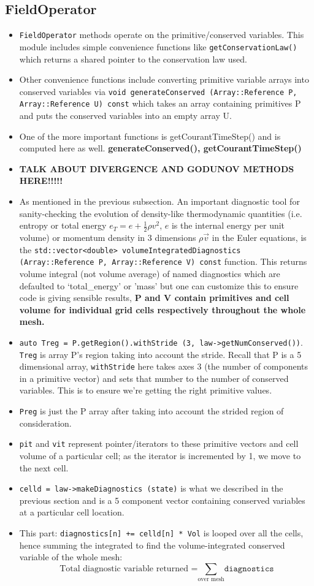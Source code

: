 \documentclass{article}
\begin{document}
\subsection{FieldOperator}
\begin{itemize}
	\item \texttt{FieldOperator} methods operate on the primitive/conserved variables. This module includes simple convenience functions like \texttt{getConservationLaw()} which returns a shared pointer to the conservation law used. 
	\item Other convenience functions include converting primitive variable arrays into conserved variables via \texttt{void generateConserved (Array::Reference P, Array::Reference U) const} which takes an array containing primitives P and puts the conserved variables into an empty array U. 
	\item One of the more important functions is getCourantTimeStep() and is computed here as well. \textbf{generateConserved(), getCourantTimeStep()}
	\item \textbf{TALK ABOUT DIVERGENCE AND GODUNOV METHODS HERE!!!!!}
	\item As mentioned in the previous subsection. An important diagnostic tool for sanity-checking the evolution of density-like thermodynamic quantities (i.e. entropy or total energy $e_T=e+\frac{1}{2}\rho v^2$, $e$ is the internal energy per unit volume) or momentum density in 3 dimensions $\rho \vec{v}$ in the Euler equations, is the \texttt{std::vector<double> volumeIntegratedDiagnostics (Array::Reference P, Array::Reference V) const} function. This returns volume integral (not volume average) of named diagnostics which are defaulted to `total\_energy' or 'mass' but one can customize this to ensure code is giving sensible results, \textbf{P and V contain primitives and cell volume for individual grid cells respectively throughout the whole mesh.} 
	\item \texttt{auto Treg = P.getRegion().withStride (3, law->getNumConserved())}. \texttt{Treg} is array P's region taking into account the stride. Recall that P is a 5 dimensional array, \texttt{withStride} here takes axes 3 (the number of components in a primitive vector) and sets that number to the number of conserved variables. This is to ensure we're getting the right primitive values.
	\item \texttt{Preg} is just the P array after taking into account the strided region of consideration.
	\item \texttt{pit} and \texttt{vit} represent pointer/iterators to these primitive vectors and cell volume of a particular cell; as the iterator is incremented by 1, we move to the next cell.
	\item  \texttt{celld = law->makeDiagnostics (state)} is what we described in the previous section and is a 5 component vector containing conserved variables at a particular cell location. 
	\item  This part: \texttt{diagnostics[n] += celld[n] * Vol} is looped over all the cells, hence summing the integrated to find the volume-integrated conserved variable of the whole mesh:
$$\text{Total diagnostic variable returned =} \sum_{\text{over mesh}} \texttt{diagnostics}$$
\end{itemize}
\end{document}
